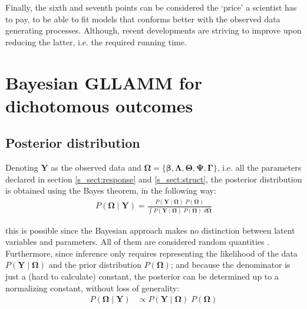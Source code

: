 Finally, the sixth and seventh points can be considered the `price' a scientist has to pay, to be able to fit models that conforms better with the observed data generating processes. Although, recent developments are striving to improve upon reducing the latter, i.e. the required running time.


\section{Bayesian GLLAMM for dichotomous outcomes} \label{sect:model}

\subsection{Posterior distribution}

Denoting $\mathbf{Y}$ as the observed data and $\pmb{\Omega} = \{ \pmb{\beta}, \pmb{\Lambda}, \pmb{\Theta}, \pmb{\Psi}, \pmb{\Gamma} \}$, i.e. all the parameters declared in section \ref{s_sect:response} and \ref{s_sect:struct}, the posterior distribution is obtained using the Bayes theorem, in the following way:
%
\begin{equation} \label{eq:posterior1}
	\begin{split}
		P(\pmb{\Omega} \; | \; \mathbf{Y}) = \frac{ P( \mathbf{Y} \; | \; \pmb{\Omega} ) \; P( \pmb{\Omega} ) }{ \int P( \mathbf{Y} \; | \; \pmb{\Omega} ) \; P( \pmb{\Omega} ) \; d\pmb{\Omega} }
	\end{split}
\end{equation}

\noindent this is possible since the Bayesian approach makes no distinction between latent variables and parameters. All of them are considered random quantities \cite{Skrondal_et_al_2004a}. Furthermore, since inference only requires representing the likelihood of the data $P( \mathbf{Y} \; | \; \pmb{\Omega} )$ and the prior distribution $P( \pmb{\Omega} )$; and because the denominator is just a (hard to calculate) constant, the posterior can be determined up to a normalizing constant, without loss of generality:
%
\begin{equation} \label{eq:posterior2}
	\begin{split}
		P(\pmb{\Omega} \; | \; \mathbf{Y}) &\propto P( \mathbf{Y} \; | \; \pmb{\Omega} ) \; P( \pmb{\Omega} )
	\end{split}
\end{equation}

